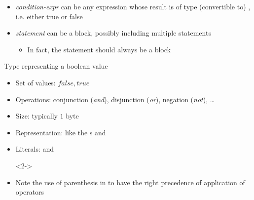 \begin{frame}[fragile]{}
\begin{itemize}
\begin{columns}[t]
  \end{columns}

  \item<5-> \textit{condition-expr} can be any expression whose result is of type
    (convertible to) , i.e. either true or false

  \item<6-> \textit{statement} can be a block, possibly including multiple
    statements
    \begin{itemize}
    \item In fact, the statement should always be a block
    \end{itemize}
  \end{itemize}

\end{frame}

\begin{frame}[fragile]{}

  Type representing a boolean value
  \begin{itemize}
  \item Set of values: ${false, true}$
  \item Operations: conjunction (\textit{and}), disjunction (\textit{or}),
    negation (\textit{not}), \ldots
  \item Size: typically $1$ byte
  \item Representation: like the s  and 
  \item Literals:  and 

    \begin{codeblock}<2->{
}\end{codeblock}

  \item<8-> Note the use of parenthesis in  to have the right
    precedence of application of operators
  \end{itemize}


\end{frame}
